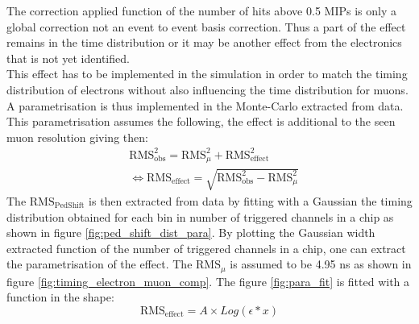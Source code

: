 \documentclass[twoside,a4paper,11pt]{article}
\begin{document}
\begin{appendix}
The correction applied function of the number of hits above 0.5 MIPs is only a global correction not an event to event basis correction. Thus a part of the effect remains in the time distribution or it may be another effect from the electronics that is not yet identified.\\
This effect has to be implemented in the simulation in order to match the timing distribution of electrons without also influencing the time distribution for muons. A parametrisation is thus implemented in the Monte-Carlo extracted from data. This parametrisation assumes the following, the effect is additional to the seen muon resolution giving then:
\begin{equation*}
\begin{split}
& \text{RMS}_{\text{obs}}^2 = \text{RMS}_{\mu}^2 + \text{RMS}_{\text{effect}}^2 \\
& \Leftrightarrow \text{RMS}_{\text{effect}} = \sqrt{\text{RMS}_{\text{obs}}^2 - \text{RMS}_{\mu}^2}
\end{split}
\end{equation*}
The $\text{RMS}_{\text{PedShift}}$ is then extracted from data by fitting with a Gaussian the timing distribution obtained for each bin in number of triggered channels in a chip as shown in figure \ref{fig:ped_shift_dist_para}. By plotting the Gaussian width extracted function of the number of triggered channels in a chip, one can extract the parametrisation of the effect. The $\text{RMS}_{\mu}$ is assumed to be 4.95 ns as shown in figure \ref{fig:timing_electron_muon_comp}. The figure \ref{fig:para_fit} is fitted with a function in the shape:
\begin{equation*}
\text{RMS}_{\text{effect}} = A \times Log( \epsilon * x )
\end{equation*}
\begin{figure}[htbp]
	\hfill

\end{figure}
\end{appendix}
\end{document}
